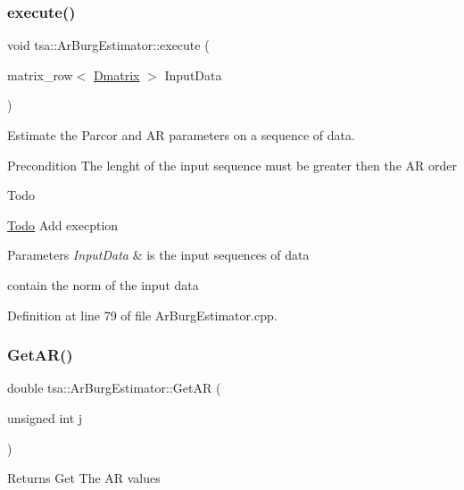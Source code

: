 \subsubsection{\texorpdfstring{execute()}{execute()}}
{\footnotesize\ttfamily void tsa\+::\+Ar\+Burg\+Estimator\+::execute (\begin{DoxyParamCaption}\item[{matrix\+\_\+row$<$ \hyperlink{namespacetsa_ad260cd21c1891c4ed391fe788569aba4}{Dmatrix} $>$}]{Input\+Data }\end{DoxyParamCaption})}



Estimate the Parcor and AR parameters on a sequence of data. 

\begin{DoxyPrecond}{Precondition}
The lenght of the input sequence must be greater then the AR order 
\end{DoxyPrecond}
\begin{DoxyRefDesc}{Todo}
\item[\hyperlink{todo__todo000002}{Todo}]Add execption\end{DoxyRefDesc}



\begin{DoxyParams}{Parameters}
{\em Input\+Data} & is the input sequences of data \\
\hline
\end{DoxyParams}
contain the norm of the input data 

Definition at line 79 of file Ar\+Burg\+Estimator.\+cpp.

\mbox{\label{classtsa_1_1_ar_burg_estimator_ae896885d9fcc18375eb2d3c00f3ceec7}} 
\subsubsection{\texorpdfstring{Get\+A\+R()}{GetAR()}}
{\footnotesize\ttfamily double tsa\+::\+Ar\+Burg\+Estimator\+::\+Get\+AR (\begin{DoxyParamCaption}\item[{unsigned int}]{j }\end{DoxyParamCaption})}

\begin{DoxyReturn}{Returns}
Get The AR values 
\end{DoxyReturn}


